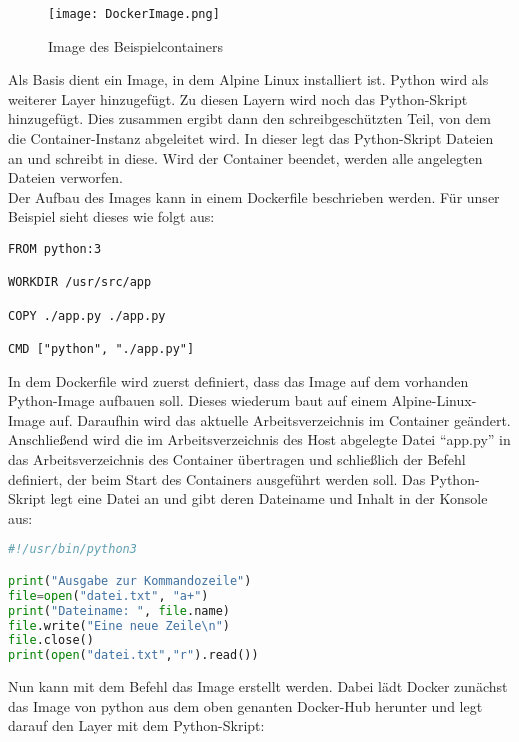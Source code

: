 \begin{figure}[h]
    \begin{center}
        \texttt{[image: DockerImage.png]}
    \end{center}
    \caption[Image des Beispielcontainers]{Image des Beispielcontainers}
    \label{fig:docker1}
    \end{figure}

Als Basis dient ein Image, in dem Alpine Linux installiert ist. Python wird als weiterer Layer hinzugefügt. Zu diesen Layern wird noch das Python-Skript hinzugefügt. Dies zusammen ergibt dann den schreibgeschützten Teil, von dem die Container-Instanz abgeleitet wird. In dieser legt das Python-Skript Dateien an und schreibt in diese. Wird der Container beendet, werden alle angelegten Dateien verworfen.\\
Der Aufbau des Images kann in einem Dockerfile beschrieben werden. Für unser Beispiel sieht dieses wie folgt aus:

\begin{lstlisting}[language=docker,caption={Dockerfile},label={code:dockerfile}]
FROM python:3 

WORKDIR /usr/src/app

COPY ./app.py ./app.py

CMD ["python", "./app.py"]
\end{lstlisting}

In dem Dockerfile wird zuerst definiert, dass das Image auf dem vorhanden Python-Image aufbauen soll. Dieses wiederum baut auf einem Alpine-Linux-Image auf. Daraufhin wird das aktuelle Arbeitsverzeichnis im Container geändert. Anschließend wird die im Arbeitsverzeichnis des Host abgelegte Datei "`app.py"' in das Arbeitsverzeichnis des Container übertragen und schließlich der Befehl definiert, der beim Start des Containers ausgeführt werden soll. Das Python-Skript legt eine Datei an und gibt deren Dateiname und Inhalt in der Konsole aus:
\begin{lstlisting}[language=python,caption={app.py},label={code:pythonapp}]
#!/usr/bin/python3

print("Ausgabe zur Kommandozeile")
file=open("datei.txt", "a+")
print("Dateiname: ", file.name)
file.write("Eine neue Zeile\n")
file.close()
print(open("datei.txt","r").read())
\end{lstlisting}
Nun kann mit dem Befehl  das Image erstellt werden. Dabei lädt Docker zunächst das Image von python aus dem oben genanten Docker-Hub herunter und legt darauf den Layer mit dem Python-Skript:

